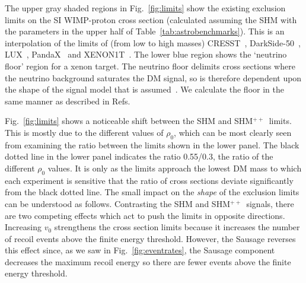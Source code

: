 \documentclass[prd,10pt,twocolumn,showpacs,nofootinbib, aps,superscriptaddress,preprintnumbers]{revtex4-1}
\newcommand{\SHMpp}{SHM$^{++}$}
\begin{document}
The upper gray shaded regions in Fig.~\ref{fig:limits} show the
existing exclusion limits on the SI WIMP-proton cross section (calculated
assuming the SHM with the parameters in the upper half of Table~\ref{tab:astrobenchmarks}).
 This is an interpolation of the limits of (from low to high masses)
CRESST~\cite{Angloher:2015ewa}, DarkSide-50~\cite{Agnes:2018oej},
LUX~\cite{Akerib:2016vxi}, PandaX~\cite{Tan:2016zwf} and
XENON1T~\cite{Aprile:2018dbl}. 
The lower blue region shows the `neutrino floor' region for a xenon target.
The neutrino floor
delimits cross sections where the neutrino background saturates the DM
signal, so is therefore dependent upon the shape of the signal model
that is assumed~\cite{OHare:2016pjy}. We calculate the floor in the same 
manner as described in Refs.~\cite{Billard:2013gfa,Ruppin:2014bra,OHare:2016pjy}

Fig.~\ref{fig:limits} shows a noticeable shift between the SHM and
\SHMpp~limits. This is mostly due to the different values of $\rho_0$,
which can be most clearly seen from examining the ratio between the
limits shown in the lower panel. The black dotted line in the lower
panel indicates the ratio 0.55/0.3, the ratio of the different
$\rho_0$ values.  It is only as the limits approach the lowest DM mass
to which each experiment is sensitive that the ratio of cross sections
deviate significantly from the black dotted line.  The small impact on
the \emph{shape} of the exclusion limits can be understood as follows.
Contrasting the SHM and \SHMpp~signals, there are two competing
effects which act to push the limits in opposite directions.
Increasing $v_0$ strengthens the cross section
limits because it increases the number of recoil events above
the finite energy threshold. However, the Sausage reverses this effect
since, as we saw in Fig.~\ref{fig:eventrates}, the Sausage component
decreases the maximum recoil energy so there are fewer events above
the finite energy threshold.
\end{document}
